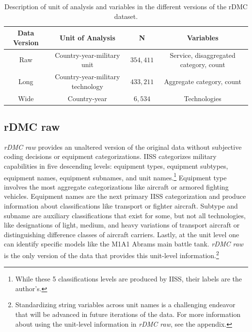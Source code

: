\documentclass[
]{article}
\begin{document}
\begin{singlespace}   
    \begin{table}[h]
        \centering              
        \caption[Categories of military capabilities]{Description of unit of analysis and variables in the different versions of the rDMC dataset.}
    \begin{tabular}{|c|c|c|c|}
            \hline
            \textbf{Data Version} & \textbf{Unit of Analysis} & \textbf{N} & \textbf{Variables} \\
            \hline
            Raw & Country-year-military unit & $354,411$ & Service, disaggregated category, count \\
            \hline
            Long & Country-year-military technology & $433,211$ & Aggregate category, count \\
            \hline
            Wide & Country-year & $6,534$ & Technologies \\
            \hline
        \end{tabular}
        \label{table:categories}
    \end{table}
    \end{singlespace}

\hypertarget{rdmc-raw}{%
\subsection{rDMC raw}\label{rdmc-raw}}

\emph{rDMC raw} provides an unaltered version of the original data without subjective coding decisions or equipment categorizations. IISS categorizes military capabilities in five descending levels: equipment types, equipment subtypes, equipment names, equipment subnames, and unit names.\footnote{While these 5 classifications levels are produced by IISS, their labels are the author's.} Equipment type involves the most aggregate categorizations like aircraft or armored fighting vehicles. Equipment names are the next primary IISS categorization and produce information about classifications like transport or fighter aircraft. Subtype and subname are auxiliary classifications that exist for some, but not all technologies, like designations of light, medium, and heavy variations of transport aircraft or distinguishing difference classes of aircraft carriers. Lastly, at the unit level one can identify specific models like the M1A1 Abrams main battle tank. \emph{rDMC raw} is the only version of the data that provides this unit-level information.\footnote{Standardizing string variables across unit names is a challenging endeavor that will be advanced in future iterations of the data. For more information about using the unit-level information in \emph{rDMC raw}, see the appendix.}
\end{document}
